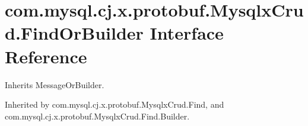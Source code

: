 \hypertarget{interfacecom_1_1mysql_1_1cj_1_1x_1_1protobuf_1_1_mysqlx_crud_1_1_find_or_builder}{}\section{com.\+mysql.\+cj.\+x.\+protobuf.\+Mysqlx\+Crud.\+Find\+Or\+Builder Interface Reference}
\label{interfacecom_1_1mysql_1_1cj_1_1x_1_1protobuf_1_1_mysqlx_crud_1_1_find_or_builder}


Inherits Message\+Or\+Builder.



Inherited by com.\+mysql.\+cj.\+x.\+protobuf.\+Mysqlx\+Crud.\+Find, and com.\+mysql.\+cj.\+x.\+protobuf.\+Mysqlx\+Crud.\+Find.\+Builder.

